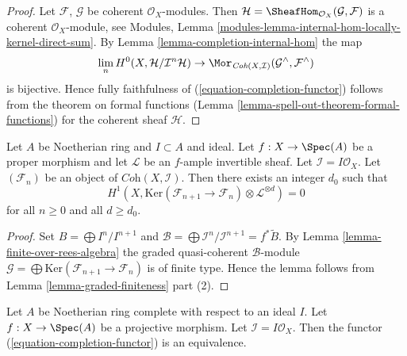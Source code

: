 \begin{proof}
Let $\mathcal{F}$, $\mathcal{G}$ be coherent $\mathcal{O}_X$-modules.
Then $\mathcal{H} = \SheafHom_{\mathcal{O}_X}(\mathcal{G}, \mathcal{F})$
is a coherent $\mathcal{O}_X$-module, see
Modules, Lemma \ref{modules-lemma-internal-hom-locally-kernel-direct-sum}.
By Lemma \ref{lemma-completion-internal-hom} the map
$$
\lim_n H^0(X, \mathcal{H}/\mathcal{I}^n\mathcal{H})
\to
\Mor_{\textit{Coh}(X, \mathcal{I})}
(\mathcal{G}^\wedge, \mathcal{F}^\wedge)
$$
is bijective. Hence fully faithfulness of
(\ref{equation-completion-functor}) follows from the theorem on formal
functions (Lemma \ref{lemma-spell-out-theorem-formal-functions})
for the coherent sheaf $\mathcal{H}$.
\end{proof}

\begin{lemma}
\label{lemma-vanishing-projective}
Let $A$ be Noetherian ring and $I \subset A$ and ideal.
Let $f : X \to \Spec(A)$ be a proper morphism and let
$\mathcal{L}$ be an $f$-ample invertible sheaf. Let
$\mathcal{I} = I\mathcal{O}_X$. Let $(\mathcal{F}_n)$ be an
object of $\textit{Coh}(X, \mathcal{I})$. Then there exists an
integer $d_0$ such that
$$
H^1(X, \text{Ker}(\mathcal{F}_{n + 1} \to \mathcal{F}_n)
\otimes \mathcal{L}^{\otimes d} )
= 0
$$
for all $n \geq 0$ and all $d \geq d_0$.
\end{lemma}

\begin{proof}
Set $B = \bigoplus I^n/I^{n + 1}$ and
$\mathcal{B} = \bigoplus \mathcal{I}^n/\mathcal{I}^{n + 1} = f^*\widetilde{B}$.
By Lemma \ref{lemma-finite-over-rees-algebra} the graded quasi-coherent
$\mathcal{B}$-module
$\mathcal{G} = \bigoplus \text{Ker}(\mathcal{F}_{n + 1} \to \mathcal{F}_n)$
is of finite type. Hence the lemma follows from
Lemma \ref{lemma-graded-finiteness} part (2).
\end{proof}

\begin{lemma}
\label{lemma-existence-projective}
Let $A$ be Noetherian ring complete with respect to an ideal $I$.
Let $f : X \to \Spec(A)$ be a projective morphism. Let
$\mathcal{I} = I\mathcal{O}_X$.
Then the functor (\ref{equation-completion-functor}) is an equivalence.
\end{lemma}

